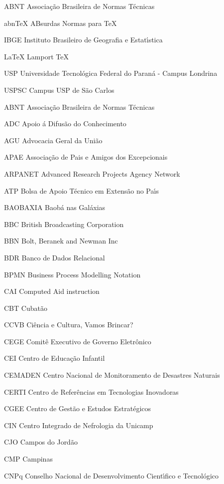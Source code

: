\begin{siglas}
    \item[ABNT] Associa\c{c}\~ao Brasileira de Normas T\'ecnicas
    \item[abnTeX] ABsurdas Normas para TeX
	\item[IBGE] Instituto Brasileiro de Geografia e Estat\'{\i}stica
	\item[LaTeX] Lamport TeX
	\item[USP] Universidade Tecnol\'ogica Federal do Paran\'a - Campus Londrina
	\item[USPSC] Campus USP de S\~ao Carlos
\item[ABNT] Associa\c{c}\~ao Brasileira de Normas T\'ecnicas
\item[ADC] Apoio \'a Difus\~ao do Conhecimento
\item[AGU] Advocacia Geral da Uni\~ao
\item[APAE] Associa\c{c}\~ao de Pais e Amigos dos Excepcionais 
\item[ARPANET] Advanced Research Projects Agency Network
\item[ATP] Bolsa de Apoio T\'ecnico em Extens\~ao no Pa\'{\i}s  
\item[BAOBAXIA] Baob\'a nas Gal\'axias
\item[BBC] British Broadcasting Corporation
\item[BBN] Bolt, Beranek and Newman Inc
\item[BDR] Banco de Dados Relacional	
\item[BPMN] Business Process Modelling Notation
\item[CAI] Computed Aid instruction
\item[CBT] Cubat\~ao
\item[CCVB] Ci\^encia e Cultura, Vamos Brincar?
\item[CEGE] Comit\^e Executivo de Governo Eletr\^onico
\item[CEI] Centro de Educa\c{c}\~ao Infantil
\item[CEMADEN] Centro Nacional de Monitoramento de Desastres Naturais
\item[CERTI] Centro de Refer\^encias em Tecnologias Inovadoras
\item[CGEE] Centro de Gest\~ao e Estudos Estrat\'egicos
\item[CIN] Centro Integrado de Nefrologia da Unicamp
\item[CJO] Campos do Jord\~ao
\item[CMP] Campinas
\item[CNPq] Conselho Nacional de Desenvolvimento Cient\'{\i}fico e Tecnol\'ogico

\end{siglas}
